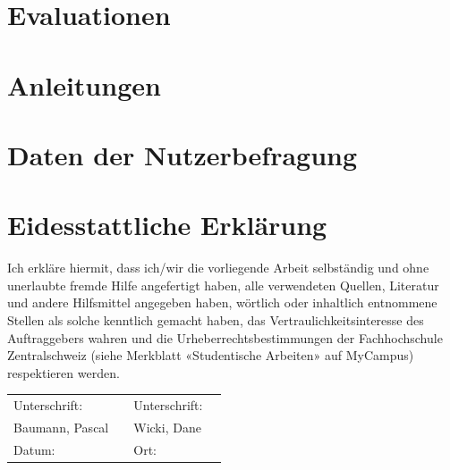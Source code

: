 \documentclass[a4paper]{scrreprt}
\begin{document}
\newpage

\chapter{Evaluationen}



\chapter{Anleitungen}



\chapter{Daten der Nutzerbefragung}



\chapter*{Eidesstattliche Erklärung}
Ich erkläre hiermit, dass ich/wir die vorliegende Arbeit selbständig und ohne unerlaubte fremde Hilfe angefertigt haben, alle verwendeten Quellen, Literatur und andere Hilfsmittel angegeben haben, wörtlich oder inhaltlich entnommene Stellen als solche kenntlich gemacht haben, das Vertraulichkeitsinteresse des Auftraggebers wahren und die Urheberrechtsbestimmungen der Fachhochschule Zentralschweiz (siehe Merkblatt «Studentische Arbeiten» auf MyCampus) respektieren werden.

\vspace{1em}

\renewcommand{\arraystretch}{2}
\begin{tabularx}{\textwidth}{XXXX}
	Unterschrift: & & Unterschrift: & \\ \cline{2-2}\cline{4-4}
	Baumann, Pascal & & Wicki, Dane & \\
	Datum: & & Ort: & \\
\end{tabularx}
\end{document}
